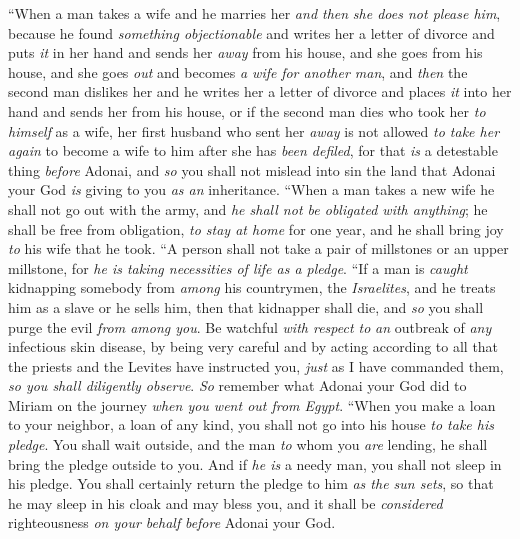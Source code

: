 \begin{biblechapter} %
\verse “When a man takes a wife and he marries her \textit{and then} \textit{she does not please him}, because he found \textit{something objectionable} and writes her a letter of divorce and puts \textit{it} in her hand and sends her \textit{away} from his house,
\verse and she goes from his house, and she goes \textit{out} and becomes \textit{a wife} \textit{for another man},
\verse and \textit{then} the second man dislikes her and he writes her a letter of divorce and places \textit{it} into her hand and sends her from his house, or if the second man dies who took her \textit{to himself} as a wife,
\verse her first husband who sent her \textit{away} is not allowed \textit{to take her again} to become a wife to him after she has \textit{been defiled}, for that \textit{is} a detestable thing \textit{before} Adonai, and \textit{so} you shall not mislead into sin the land that Adonai your God \textit{is} giving to you \textit{as an} inheritance.
\verse “When a man takes a new wife he shall not go out with the army, and \textit{he shall not be obligated with anything}; he shall be free from obligation, \textit{to stay at home} for one year, and he shall bring joy \textit{to} his wife that he took.
\verse “A person shall not take a pair of millstones or an upper millstone, for \textit{he is taking necessities of life as a pledge}.
\verse “If a man is \textit{caught} kidnapping somebody from \textit{among} his countrymen, the \textit{Israelites}, and he treats him as a slave or he sells him, then that kidnapper shall die, and \textit{so} you shall purge the evil \textit{from among you}.
\verse Be watchful \textit{with respect to} \textit{an} outbreak of \textit{any} infectious skin disease, by being very careful and by acting according to all that the priests and the Levites have instructed you, \textit{just} as I have commanded them, \textit{so you shall diligently observe}.
\verse \textit{So} remember what Adonai your God did to Miriam on the journey \textit{when you went out from Egypt}.
\verse “When you make a loan to your neighbor, a loan of any kind, you shall not go into his house \textit{to take his pledge}.
\verse You shall wait outside, and the man \textit{to} whom you \textit{are} lending, he shall bring the pledge outside to you.
\verse And if \textit{he is} a needy man, you shall not sleep in his pledge.
\verse You shall certainly return the pledge to him \textit{as the sun sets}, so that he may sleep in his cloak and may bless you, and it shall be \textit{considered} righteousness \textit{on your behalf} \textit{before} Adonai your God.

\end{biblechapter}
